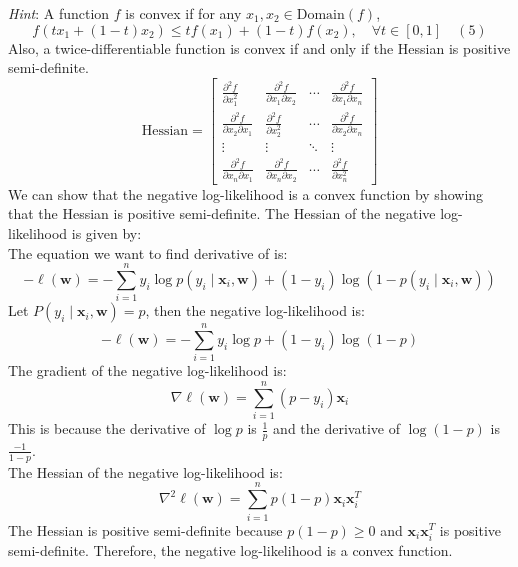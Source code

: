 \documentclass[a3paper,12pt]{extarticle} %
\begin{document}
\textit{Hint}: A function $f$ is convex if for any $x_1, x_2 \in \text{Domain}(f)$,
\[
f(tx_1 + (1 - t)x_2) \leq t f(x_1) + (1 - t) f(x_2), \quad \forall t \in [0, 1] \quad (5)
\]
Also, a twice-differentiable function is convex if and only if the Hessian is positive semi-definite.
\[
\text{Hessian} = \begin{bmatrix}
    \frac{\partial^2 f}{\partial x_1^2} & \frac{\partial^2 f}{\partial x_1 \partial x_2} & \cdots & \frac{\partial^2 f}{\partial x_1 \partial x_n} \\
    \frac{\partial^2 f}{\partial x_2 \partial x_1} & \frac{\partial^2 f}{\partial x_2^2} & \cdots & \frac{\partial^2 f}{\partial x_2 \partial x_n} \\
    \vdots & \vdots & \ddots & \vdots \\
    \frac{\partial^2 f}{\partial x_n \partial x_1} & \frac{\partial^2 f}{\partial x_n \partial x_2} & \cdots & \frac{\partial^2 f}{\partial x_n^2}
\end{bmatrix}
\]
We can show that the negative log-likelihood is a convex function by showing that the Hessian is positive semi-definite. The Hessian of the negative log-likelihood is given by:
\\ The equation we want to find derivative of is:
\[
-\ell(\mathbf{w}) = -\sum_{i=1}^n y_i \log p(y_i \mid \mathbf{x}_i, \mathbf{w}) + (1 - y_i) \log (1 - p(y_i \mid \mathbf{x}_i, \mathbf{w}))
\]
Let \(P(y_i \mid \mathbf{x}_i, \mathbf{w}) = p\), then the negative log-likelihood is:
\[
-\ell(\mathbf{w}) = -\sum_{i=1}^n y_i \log p + (1 - y_i) \log (1 - p)
\]
The gradient of the negative log-likelihood is:
\[
\nabla \ell(\mathbf{w}) = \sum_{i=1}^n \left( p - y_i \right) \mathbf{x}_i
\]
This is because the derivative of \( \log p \) is \( \frac{1}{p} \) and the derivative of \( \log (1 - p) \) is \( \frac{-1}{1 - p} \). 
\\ The Hessian of the negative log-likelihood is:
\[
\nabla^2 \ell(\mathbf{w}) = \sum_{i=1}^n p(1 - p) \mathbf{x}_i \mathbf{x}_i^T
\]
The Hessian is positive semi-definite because \( p(1 - p) \geq 0 \) and \( \mathbf{x}_i \mathbf{x}_i^T \) is positive semi-definite. Therefore, the negative log-likelihood is a convex function.\\
\end{document}
